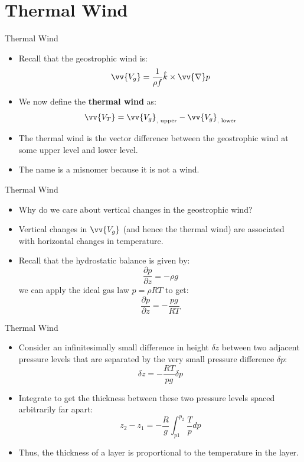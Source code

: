 \section{Thermal Wind} %
\begin{frame}{Thermal Wind}

\begin{itemize}
	\item Recall that the geostrophic wind is:
	$$\vv{V_g} = \frac{1}{\rho f}\hat k \times \vv{\nabla} p$$
	\item We now define the \textbf{thermal wind} as:
	$$\vv{V_T} = \vv{V_g}_{\text{, upper}} -  \vv{V_g}_{\text{, lower}}$$
	\item The thermal wind is the vector difference between the geostrophic wind at some upper level and lower level.
	\item The name is a misnomer because it is not a wind.
\end{itemize}
\end{frame}
\begin{frame}{Thermal Wind}

\begin{itemize}
	\item Why do we care about vertical changes in the geostrophic wind?
	\item Vertical changes in $\vv{V_g}$ (and hence the thermal wind) are associated with horizontal changes in temperature.
	\item Recall that the hydrostatic balance is given by:
	$$\frac{\partial p}{\partial z} = -\rho g$$
	we can apply the ideal gas law $p=\rho R T$ to get:
	$$\frac{\partial p}{\partial z} = -\frac{pg}{RT}$$
\end{itemize}
\end{frame}
\begin{frame}{Thermal Wind}

\begin{itemize}
	\item Consider an infinitesimally small difference in height $\delta z$ between two adjacent pressure levels that are separated by the very small pressure difference $\delta p$:
	$$\delta z = -\frac{RT}{pg}\delta p$$
	\item Integrate to get the thickness between these two pressure levels spaced arbitrarily far apart:
	$$z_2 - z_1 = -\frac{R}{g}\int^{p_2}_{p1} \frac{T}{p} dp$$
	\item Thus, the thickness of a layer is proportional to the temperature in the layer.
\end{itemize}
\end{frame}
